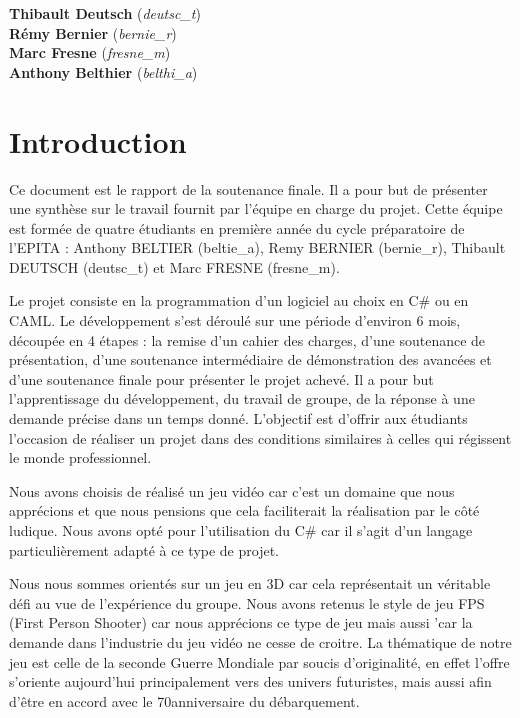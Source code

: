 \documentclass[11pt]{report}
\begin{document}
\begin{titlepage}
\Large
\textbf{Thibault Deutsch} (\emph{deutsc\_t}) \\
\textbf{Rémy Bernier} (\emph{bernie\_r}) \\
\textbf{Marc Fresne} (\emph{fresne\_m}) \\
\textbf{Anthony Belthier} (\emph{belthi\_a})\\[2cm]

\vfill %

\end{titlepage}

\newpage
{}

\chapter*{Introduction}

Ce document est le rapport de la soutenance finale. Il a pour but de présenter une synthèse sur le travail fournit par l'équipe en charge du projet. Cette équipe est formée de quatre étudiants en première année du cycle préparatoire de l'EPITA : Anthony BELTIER (beltie\_a), Remy BERNIER (bernie\_r), Thibault DEUTSCH (deutsc\_t) et Marc FRESNE (fresne\_m).

Le projet consiste en la programmation d'un logiciel au choix en C\# ou en CAML. Le développement s'est déroulé sur une période d'environ 6 mois, découpée en 4 étapes : la remise d'un cahier des charges, d'une soutenance de présentation, d'une soutenance intermédiaire de démonstration des avancées et d'une soutenance finale pour présenter le projet achevé. Il a pour but l'apprentissage du développement, du travail de groupe, de la réponse à une demande précise dans un temps donné. L'objectif est d'offrir aux étudiants l'occasion de réaliser un projet dans des conditions similaires à celles qui régissent le monde professionnel.

Nous avons choisis de réalisé un jeu vidéo car c'est un domaine que nous apprécions et que nous pensions que cela faciliterait la réalisation par le côté ludique. Nous avons opté pour l’utilisation du C\# car il s’agit d’un langage particulièrement adapté à ce type de projet. 

Nous nous sommes orientés sur un jeu en 3D car cela représentait un véritable défi au vue de l'expérience du groupe. Nous avons retenus le style de jeu FPS (First Person Shooter) car nous apprécions ce type de jeu mais aussi 'car la demande dans l'industrie du jeu vidéo ne cesse de croitre. La thématique de notre jeu est celle de la seconde Guerre Mondiale par soucis d'originalité, en effet l'offre s’oriente aujourd'hui principalement vers des univers futuristes, mais aussi afin d'être en accord avec le 70\ieme anniversaire du débarquement.
\end{document}
